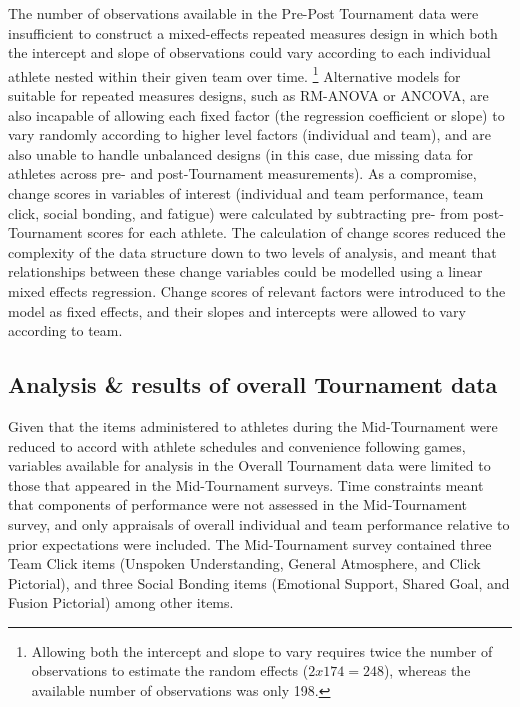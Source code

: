 \begin{CJK}{UTF8}{gbsn}

 The number of observations available in the Pre-Post Tournament data were insufficient to construct a mixed-effects repeated measures design in which both the intercept and slope of observations could vary according to each individual athlete nested within their given team over time.
    \footnote{Allowing both the intercept and slope to vary requires twice the number of observations to estimate the random effects ($2x174 = 248$), whereas the available number of observations was only 198.}
  Alternative models for suitable for repeated measures designs, such as RM-ANOVA or ANCOVA, are also incapable of allowing each fixed factor (the regression coefficient or slope) to vary randomly according to higher level factors (individual and team), and are also unable to handle unbalanced designs (in this case, due missing data for athletes across pre- and post-Tournament measurements). As a compromise, change scores in variables of interest (individual and team performance, team click, social bonding, and fatigue) were calculated by subtracting pre- from post-Tournament scores for each athlete. The calculation of change scores reduced the complexity of the data structure down to two levels of analysis, and meant that relationships between these change variables could be modelled using a linear mixed effects regression. Change scores of relevant factors were introduced to the model as fixed effects, and their slopes and intercepts were allowed to vary according to team.




\subsection{Analysis \& results of overall Tournament data}
Given that the items administered to athletes during the Mid-Tournament were reduced to accord with athlete schedules and convenience following games, variables available for analysis in the Overall Tournament data were limited to those that appeared in the Mid-Tournament surveys.  Time constraints meant that components of performance were not assessed in the Mid-Tournament survey, and only appraisals of overall individual and team performance relative to prior expectations were included.  The Mid-Tournament survey contained three Team Click items (Unspoken Understanding, General Atmosphere, and Click Pictorial), and three Social Bonding items (Emotional Support, Shared Goal, and Fusion Pictorial) among other items.

















\end{CJK}
